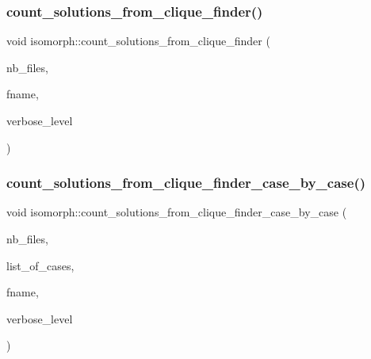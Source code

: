 \subsubsection{\texorpdfstring{count\+\_\+solutions\+\_\+from\+\_\+clique\+\_\+finder()}{count\_solutions\_from\_clique\_finder()}}
{\footnotesize\ttfamily void isomorph\+::count\+\_\+solutions\+\_\+from\+\_\+clique\+\_\+finder (\begin{DoxyParamCaption}\item[{\mbox{\hyperlink{galois_8h_a09fddde158a3a20bd2dcadb609de11dc}{I\+NT}}}]{nb\+\_\+files,  }\item[{const \mbox{\hyperlink{galois_8h_ab6cc7b4aeb6ea31aba2b3fbfc83ff5e6}{B\+Y\+TE}} $\ast$$\ast$}]{fname,  }\item[{\mbox{\hyperlink{galois_8h_a09fddde158a3a20bd2dcadb609de11dc}{I\+NT}}}]{verbose\+\_\+level }\end{DoxyParamCaption})}

\mbox{\label{classisomorph_ab76ca306e180ca53e30d7edd66931d83}} 
\subsubsection{\texorpdfstring{count\+\_\+solutions\+\_\+from\+\_\+clique\+\_\+finder\+\_\+case\+\_\+by\+\_\+case()}{count\_solutions\_from\_clique\_finder\_case\_by\_case()}}
{\footnotesize\ttfamily void isomorph\+::count\+\_\+solutions\+\_\+from\+\_\+clique\+\_\+finder\+\_\+case\+\_\+by\+\_\+case (\begin{DoxyParamCaption}\item[{\mbox{\hyperlink{galois_8h_a09fddde158a3a20bd2dcadb609de11dc}{I\+NT}}}]{nb\+\_\+files,  }\item[{\mbox{\hyperlink{galois_8h_a09fddde158a3a20bd2dcadb609de11dc}{I\+NT}} $\ast$}]{list\+\_\+of\+\_\+cases,  }\item[{const \mbox{\hyperlink{galois_8h_ab6cc7b4aeb6ea31aba2b3fbfc83ff5e6}{B\+Y\+TE}} $\ast$$\ast$}]{fname,  }\item[{\mbox{\hyperlink{galois_8h_a09fddde158a3a20bd2dcadb609de11dc}{I\+NT}}}]{verbose\+\_\+level }\end{DoxyParamCaption})}

